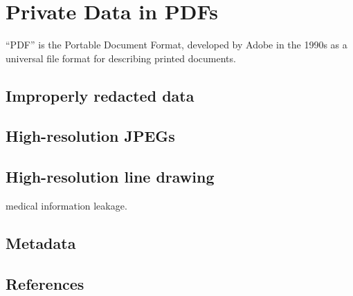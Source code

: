 \chapter{Private Data in PDFs}
``PDF'' is the Portable Document Format, developed by Adobe in the
1990s as a universal file format for describing printed documents. 
\section{Improperly redacted data}
\section{High-resolution JPEGs}
\section{High-resolution line drawing}
medical information leakage.
\section{Metadata}
\section{References}



